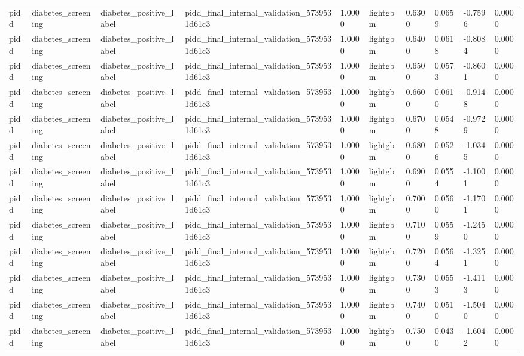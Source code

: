 \begin{tabular}{llllllllll}
pidd & diabetes\_screening & diabetes\_positive\_label & pidd\_final\_internal\_validation\_5739531d61c3 & 1.0000 & lightgbm & 0.6300 & 0.0659 & -0.7596 & 0.0000 \\
pidd & diabetes\_screening & diabetes\_positive\_label & pidd\_final\_internal\_validation\_5739531d61c3 & 1.0000 & lightgbm & 0.6400 & 0.0618 & -0.8084 & 0.0000 \\
pidd & diabetes\_screening & diabetes\_positive\_label & pidd\_final\_internal\_validation\_5739531d61c3 & 1.0000 & lightgbm & 0.6500 & 0.0573 & -0.8601 & 0.0000 \\
pidd & diabetes\_screening & diabetes\_positive\_label & pidd\_final\_internal\_validation\_5739531d61c3 & 1.0000 & lightgbm & 0.6600 & 0.0610 & -0.9148 & 0.0000 \\
pidd & diabetes\_screening & diabetes\_positive\_label & pidd\_final\_internal\_validation\_5739531d61c3 & 1.0000 & lightgbm & 0.6700 & 0.0548 & -0.9729 & 0.0000 \\
pidd & diabetes\_screening & diabetes\_positive\_label & pidd\_final\_internal\_validation\_5739531d61c3 & 1.0000 & lightgbm & 0.6800 & 0.0526 & -1.0345 & 0.0000 \\
pidd & diabetes\_screening & diabetes\_positive\_label & pidd\_final\_internal\_validation\_5739531d61c3 & 1.0000 & lightgbm & 0.6900 & 0.0554 & -1.1001 & 0.0000 \\
pidd & diabetes\_screening & diabetes\_positive\_label & pidd\_final\_internal\_validation\_5739531d61c3 & 1.0000 & lightgbm & 0.7000 & 0.0560 & -1.1701 & 0.0000 \\
pidd & diabetes\_screening & diabetes\_positive\_label & pidd\_final\_internal\_validation\_5739531d61c3 & 1.0000 & lightgbm & 0.7100 & 0.0559 & -1.2450 & 0.0000 \\
pidd & diabetes\_screening & diabetes\_positive\_label & pidd\_final\_internal\_validation\_5739531d61c3 & 1.0000 & lightgbm & 0.7200 & 0.0564 & -1.3251 & 0.0000 \\
pidd & diabetes\_screening & diabetes\_positive\_label & pidd\_final\_internal\_validation\_5739531d61c3 & 1.0000 & lightgbm & 0.7300 & 0.0553 & -1.4113 & 0.0000 \\
pidd & diabetes\_screening & diabetes\_positive\_label & pidd\_final\_internal\_validation\_5739531d61c3 & 1.0000 & lightgbm & 0.7400 & 0.0510 & -1.5040 & 0.0000 \\
pidd & diabetes\_screening & diabetes\_positive\_label & pidd\_final\_internal\_validation\_5739531d61c3 & 1.0000 & lightgbm & 0.7500 & 0.0430 & -1.6042 & 0.0000 \\

\end{tabular}
